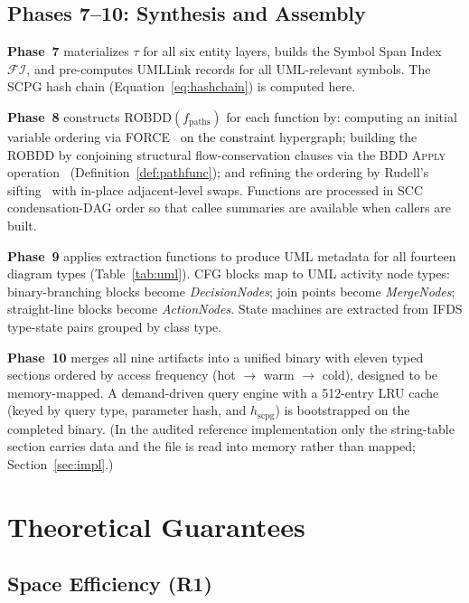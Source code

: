\documentclass[journal,10pt,twoside]{IEEEtran}
\newcommand{\tauF}{\tau}
\newcommand{\FI}{\mathcal{FI}}
\newcommand{\ROBDD}{\mathrm{ROBDD}}
\newcommand{\hscpg}{h_{\mathrm{scpg}}}
\begin{document}
\subsection{Phases 7--10: Synthesis and Assembly}

\textbf{Phase~7} materializes $\tauF$ for all six entity
layers, builds the Symbol Span Index $\FI$, and pre-computes
UMLLink records for all UML-relevant symbols.  The SCPG
hash chain (Equation~\ref{eq:hashchain}) is computed here.

\textbf{Phase~8} constructs $\ROBDD(f_{\mathrm{paths}})$
for each function by: computing an initial variable ordering
via FORCE~\cite{aloul03} on the constraint hypergraph; building
the ROBDD by conjoining structural flow-conservation clauses
via the BDD \textsc{Apply} operation~\cite{bryant86}
(Definition~\ref{def:pathfunc}); and refining the ordering by
Rudell's sifting~\cite{rudell93} with in-place adjacent-level
swaps.
Functions are processed in SCC condensation-DAG order so
that callee summaries are available when callers are built.

\textbf{Phase~9} applies extraction functions to produce
UML metadata for all fourteen diagram types (Table~\ref{tab:uml}).
CFG blocks map to UML activity node types: binary-branching
blocks become \textit{DecisionNodes}; join points become
\textit{MergeNodes}; straight-line blocks become
\textit{ActionNodes}.  State machines are extracted from
IFDS type-state pairs grouped by class type.

\textbf{Phase~10} merges all nine artifacts into a unified
binary with eleven typed sections ordered by access frequency
(hot $\to$ warm $\to$ cold), designed to be memory-mapped.  A
demand-driven query engine with a 512-entry LRU cache (keyed
by query type, parameter hash, and $\hscpg$) is bootstrapped
on the completed binary.  (In the audited reference
implementation only the string-table section carries data and
the file is read into memory rather than mapped;
Section~\ref{sec:impl}.)

\section{Theoretical Guarantees}\label{sec:theory}

\subsection{Space Efficiency (R1)}
\end{document}

